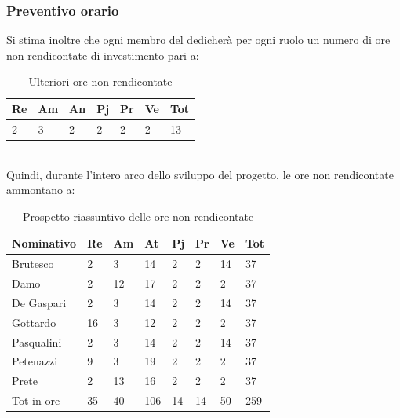 		\subsubsection {Preventivo orario}
		Si stima inoltre che ogni membro del  dedicherà per ogni ruolo un numero di ore non rendicontate di investimento pari a:\\
		\begin{table}[H] \begin{center} \begin{tabular}{lllllll}
		\toprule
			Re	&	Am	&	An	&	Pj	&	Pr	&	Ve	&	Tot	 \\
		\midrule
			2	&	3	&	2	&	2	&	2	&	2	&	13	 \\
		\bottomrule
		\end{tabular} \end{center}
		\caption{Ulteriori ore non rendicontate}
		\label{tab:h_ulteriori}
        \end{table}\mbox{}\\

		Quindi, durante l'intero arco dello sviluppo del progetto, le ore non rendicontate ammontano a:\\

							\begin{table}[H] \begin{center} \begin{tabular}{llllllll}
							\toprule
							\textbf{Nominativo}	&	\textbf{Re}	&	\textbf{Am}	&	\textbf{At}	&	\textbf{Pj}	&	\textbf{Pr}	&	\textbf{Ve}	&	\textbf{Tot}\\
							\midrule
							Brutesco	&	2	&	3	&	14	&	2	&	2	&	14	&	37	 \\
							Damo		&	2	&	12	&	17	&	2	&	2	&	2	&	37	 \\
							De Gaspari	&	2	&	3	&	14	&	2	&	2	&	14	&	37	 \\
							Gottardo	&	16	&	3	&	12	&	2	&	2	&	2	&	37	 \\
							Pasqualini	&	2	&	3	&	14	&	2	&	2	&	14	&	37	 \\
							Petenazzi	&	9	&	3	&	19	&	2	&	2	&	2	&	37	 \\
							Prete		&	2	&	13	&	16	&	2	&	2	&	2	&	37	 \\
							\midrule
							Tot in ore	&	35	&	40	&	106	&	14	&	14	&	50	&	259	 \\
							\bottomrule
							\end{tabular} \end{center}
							\caption{Prospetto riassuntivo delle ore non rendicontate}
							\label{tab:h_TotaleNonRendicontato} \end{table}\mbox{}\\

